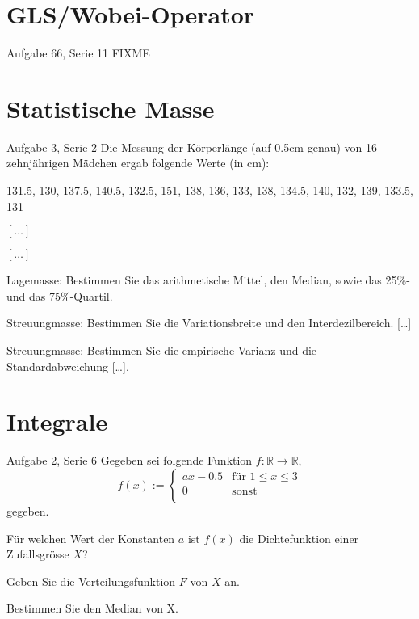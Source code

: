 \documentclass{beamer}
\begin{document}
\section{GLS/Wobei-Operator}
\begin{frame}{Aufgabe 66, Serie 11}
    FIXME
\end{frame}

\section{Statistische Masse}
\begin{frame}{Aufgabe 3, Serie 2}
Die Messung der Körperlänge (auf 0.5cm genau) von 16 zehnjährigen Mädchen ergab
folgende Werte (in cm):

\begin{center}
131.5, 130, 137.5, 140.5, 132.5, 151, 138, 136, 133, 138, 134.5, 140, 132, 139, 133.5, 131
\end{center}
\begin{outline}
\item $[\dots]$
\item $[\dots]$
\item Lagemasse: Bestimmen Sie das arithmetische Mittel, den Median, sowie das 25\%-
und das 75\%-Quartil.
\item Streuungmasse: Bestimmen Sie die Variationsbreite und den Interdezilbereich. [\dots]
\item Streuungmasse: Bestimmen Sie die empirische Varianz und die Standardabweichung [\dots].
\end{outline}
\end{frame}

\section{Integrale}
\begin{frame}{Aufgabe 2, Serie 6}
Gegeben sei folgende Funktion $f : \mathbb{R }\rightarrow \mathbb{R}$,
$$
f(x):=\begin{cases} ax-0.5 & \text{für } 1 \le x \le 3\\
     0 & \text{sonst}\\
     \end{cases}
$$
gegeben. 
\begin{outline}
\item Für welchen Wert der Konstanten $a$ ist $f(x)$ die Dichtefunktion einer Zufallsgrösse $X$?
\item Geben Sie die Verteilungsfunktion $F$ von $X$ an.
\item Bestimmen Sie den Median von X.
\end{outline}
\end{frame}
\end{document}
